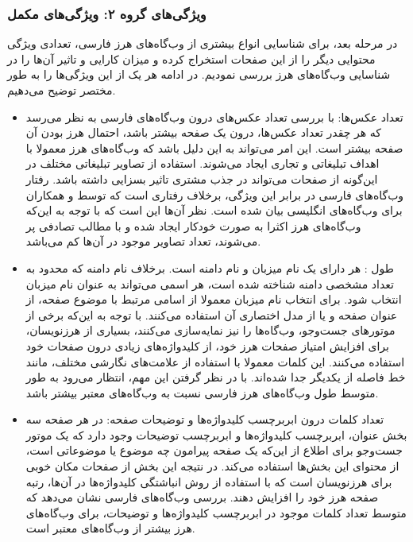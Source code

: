 \documentclass[twoside, a4paper,11pt]{book}
\numberwithin{equation}{chapter}
\numberwithin{table}{chapter}
\numberwithin{figure}{chapter}
\numberwithin{equation}{chapter}
\begin{document}
\subsubsection{ویژگی‌های گروه ۲: ویژگی‌های مکمل}
در مرحله بعد، برای شناسایی انواع بیشتری از وب‌گاه‌های هرز فارسی، تعدادی ویژگی محتوایی دیگر \cite{Fetterly:2004, Prieto:2013, Urvoy:2008tracking} را از این صفحات استخراج کرده و میزان کارایی و تاثیر آن‌ها را در شناسایی وب‌گاه‌های هرز بررسی نمودیم. در ادامه هر یک از این ویژگی‌ها را به طور مختصر توضیح می‌دهیم.
\begin{itemize}
\item
تعداد عکس‌ها: با بررسی تعداد عکس‌های درون وب‌گاه‌های فارسی به نظر می‌رسد که هر چقدر تعداد عکس‌ها، درون یک صفحه بیشتر باشد، احتمال هرز بودن آن صفحه بیشتر است. این امر می‌تواند به این دلیل باشد که وب‌گاه‌های هرز معمولا با اهداف تبلیغاتی و تجاری ایجاد می‌شوند. استفاده از تصاویر تبلیغاتی مختلف در این‌گونه از صفحات می‌تواند در جذب مشتری تاثیر بسزایی داشته باشد. رفتار وب‌گاه‌های فارسی در برابر این ویژگی، برخلاف رفتاری است که توسط  و همکاران \cite{Prieto:2013} برای وب‌گاه‌های انگلیسی بیان شده است. نظر آن‌ها این است که با توجه به این‌که وب‌گاه‌های هرز اکثرا به صورت خودکار ایجاد شده و با مطالب تصادفی پر می‌شوند،  تعداد تصاویر موجود در آن‌ها کم می‌باشد.
\item
طول : هر  دارای یک نام میزبان و نام دامنه است. برخلاف نام دامنه که محدود به تعداد مشخصی دامنه شناخته شده است، هر اسمی می‌تواند به عنوان نام میزبان انتخاب شود. برای انتخاب نام میزبان معمولا از اسامی مرتبط با موضوع صفحه، از عنوان صفحه و یا از مدل اختصاری آن استفاده می‌کنند. با توجه به این‌که برخی از موتورهای جست‌و‌جو،  وب‌گاه‌‌ها را نیز نمایه‌سازی می‌کنند، بسیاری از هرزنویسان، برای افزایش امتیاز صفحات هرز خود، از کلیدواژه‌های زیادی درون  صفحات خود استفاده می‌کنند. این کلمات معمولا با استفاده از علامت‌های نگارشی مختلف، مانند خط فاصله از یکدیگر جدا شده‌اند. با در نظر گرفتن این مهم، انتظار می‌رود به طور متوسط طول  وب‌گاه‌های هرز فارسی نسبت به وب‌گاه‌های معتبر بیشتر باشد.
\item
تعداد کلمات درون ابربرچسب کلیدواژه‌ها و توضیحات صفحه: در هر صفحه  سه بخش عنوان، ابربرچسب کلیدواژه‌ها و ابربرچسب توضیحات وجود دارد که یک موتور جست‌و‌جو برای اطلاع از این‌که یک صفحه پیرامون چه موضوع یا موضوعاتی است، از محتوای این بخش‌ها استفاده می‌کند. در نتیجه این بخش از صفحات مکان خوبی برای هرزنویسان است که با استفاده از روش انباشتگی کلید‌واژه‌ها در آن‌ها، رتبه صفحه هرز خود را افزایش دهند. بررسی وب‌گاه‌های فارسی نشان می‌دهد که متوسط تعداد کلمات موجود در ابربرچسب کلیدواژه‌ها و توضیحات، برای وب‌گاه‌‌های هرز بیشتر از وب‌گاه‌های معتبر است.

\end{itemize}
\end{document}

